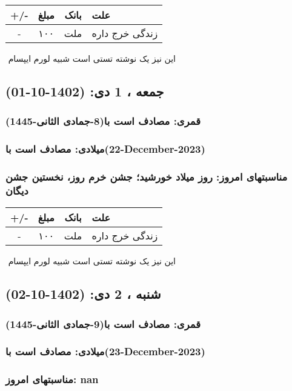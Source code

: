 \documentclass{article}
\newcommand{\rnote}[1]{\marginpar{\textcolor{color}{\StrSubstitute{\##1}{ }{\_}}}}
\newcommand{\myRow}[4]{
    #1 & #2 & #3 & #4 \\ \hline
}
\begin{document}
\begin{tabular}{ | c | c | c | p{5cm} |}
    \hline
    \myRow{ +/- }{مبلغ}{بانک}{علت}
    \myRow{-}{۱۰۰}{ملت}{زندگی خرج داره}
\end{tabular}
\newline
\newline

‌
\rnote{تست}
این نیز یک نوشته تستی است شبیه لورم ایپسام




\newpage
{}
\textcolor{color}{
\section{ جمعه ، 1 دی: (1402-10-01) }
\subsubsection*{قمری: مصادف است با(8-جمادی الثانی-1445)} 
\subsubsection*{میلادی: مصادف است با(22-December-2023)}
\subsubsection*{مناسبتهای امروز: روز میلاد خورشید؛ جشن خرم روز، نخستین جشن دیگان}
}


\begin{tabular}{ | c | c | c | p{5cm} |}
    \hline
    \myRow{ +/- }{مبلغ}{بانک}{علت}
    \myRow{-}{۱۰۰}{ملت}{زندگی خرج داره}
\end{tabular}
\newline
\newline

‌
\rnote{تست}
این نیز یک نوشته تستی است شبیه لورم ایپسام




\newpage
{}
\textcolor{color}{
\section{ شنبه ، 2 دی: (1402-10-02) }
\subsubsection*{قمری: مصادف است با(9-جمادی الثانی-1445)} 
\subsubsection*{میلادی: مصادف است با(23-December-2023)}
\subsubsection*{مناسبتهای امروز: nan}
}
\end{document}
